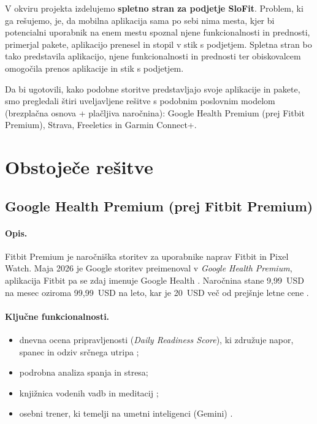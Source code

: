 \documentclass[11pt,a4paper]{article}
\begin{document}
V okviru projekta izdelujemo \textbf{spletno stran za podjetje SloFit}. Problem, ki ga rešujemo, je, da mobilna aplikacija sama po sebi nima mesta, kjer bi potencialni uporabnik na enem mestu spoznal njene funkcionalnosti in prednosti, primerjal pakete, aplikacijo prenesel in stopil v stik s podjetjem. Spletna stran bo tako predstavila aplikacijo, njene funkcionalnosti in prednosti ter obiskovalcem omogočila prenos aplikacije in stik s podjetjem.

Da bi ugotovili, kako podobne storitve predstavljajo svoje aplikacije in pakete, smo pregledali štiri uveljavljene rešitve s podobnim poslovnim modelom (brezplačna osnova + plačljiva naročnina): Google Health Premium (prej Fitbit Premium), Strava, Freeletics in Garmin Connect+.


\section{Obstoječe rešitve}

\subsection{Google Health Premium (prej Fitbit Premium)}

\paragraph{Opis.} Fitbit Premium je naročniška storitev za uporabnike naprav Fitbit in Pixel Watch. Maja 2026 je Google storitev preimenoval v \emph{Google Health Premium}, aplikacija Fitbit pa se zdaj imenuje Google Health \cite{freedom251}. Naročnina stane 9,99~USD na mesec oziroma 99,99~USD na leto, kar je 20~USD več od prejšnje letne cene \cite{androidauthority_gh}.

\paragraph{Ključne funkcionalnosti.}
\begin{itemize}
  \item dnevna ocena pripravljenosti (\emph{Daily Readiness Score}), ki združuje napor, spanec in odziv srčnega utripa \cite{wareable_fitbit};
  \item podrobna analiza spanja in stresa;
  \item knjižnica vodenih vadb in meditacij \cite{techradar_fitbit};
  \item osebni trener, ki temelji na umetni inteligenci (Gemini) \cite{googlestore_fitbit}.
\end{itemize}
\end{document}
